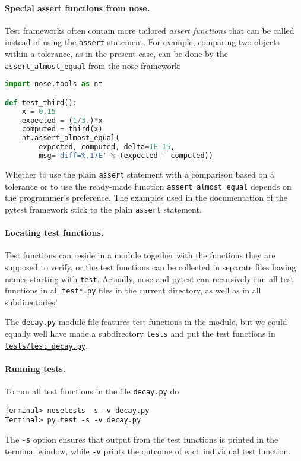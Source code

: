 \documentclass[graybox,sectrefs,envcountresetchap,open=right,final]{svmonodo}
\begin{document}
\paragraph{Special assert functions from nose.}
Test frameworks often contain more tailored
\emph{assert functions} that can be called instead of using the \texttt{assert}
statement. For example, comparing two objects within
a tolerance, as in the present
case, can be done by the \Verb!assert_almost_equal! from the nose
framework:

\begin{lstlisting}[language=Python,style=blue1_bluegreen]
import nose.tools as nt

def test_third():
    x = 0.15
    expected = (1/3.)*x
    computed = third(x)
    nt.assert_almost_equal(
        expected, computed, delta=1E-15,
        msg='diff=%.17E' % (expected - computed))
\end{lstlisting}

Whether to use the plain \texttt{assert} statement with a comparison based on
a tolerance or to use the ready-made function \Verb!assert_almost_equal!
depends on the programmer's preference. The examples used in the
documentation of the pytest framework stick to the plain \texttt{assert}
statement.

\paragraph{Locating test functions.}
Test functions can reside in a module together with the functions they
are supposed to verify, or the test functions can be collected in
separate files having names starting with \texttt{test}. Actually,
nose and pytest can recursively run all test functions
in all \texttt{test*.py}
files in the current directory, as well as in all subdirectories!

The \href{{http://tinyurl.com/ofkw6kc/softeng/decay.py}}{\nolinkurl{decay.py}} module file features
test functions in the module, but we could equally well have made
a subdirectory \texttt{tests} and put the test functions in
\href{{http://tinyurl.com/ofkw6kc/softeng/tests/test_decay.py}}{\nolinkurl{tests/test_decay.py}}.

\paragraph{Running tests.}
To run all test functions in the file \texttt{decay.py} do

\begin{Verbatim}[frame=lines,label=\fbox{{\tiny Terminal}},framesep=2.5mm,framerule=0.7pt,fontsize=\fontsize{9pt}{9pt}]
Terminal> nosetests -s -v decay.py
Terminal> py.test -s -v decay.py
\end{Verbatim}
The \texttt{-s} option ensures that output from the test functions is printed
in the terminal window, while \texttt{-v} prints the outcome of each individual
test function.
\end{document}
